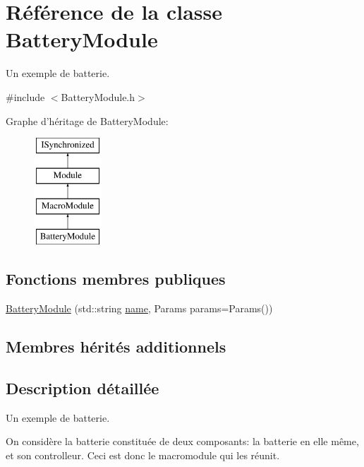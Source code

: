 \hypertarget{classBatteryModule}{\section{Référence de la classe Battery\-Module}
\label{classBatteryModule}
}


Un exemple de batterie.  




{\ttfamily \#include $<$Battery\-Module.\-h$>$}

Graphe d'héritage de Battery\-Module\-:\begin{figure}[H]
\begin{center}
\leavevmode
\includegraphics[height=4.000000cm]{classBatteryModule}
\end{center}
\end{figure}
\subsection*{Fonctions membres publiques}
\begin{DoxyCompactItemize}
\item 
\hyperlink{classBatteryModule_a2fb494ef5f124c38c0fdf9ccfb31918f}{Battery\-Module} (std\-::string \hyperlink{classModule_a794fbb44972c7c73cc197159093e66d1}{name}, Params params=Params())
\end{DoxyCompactItemize}
\subsection*{Membres hérités additionnels}


\subsection{Description détaillée}
Un exemple de batterie. 

On considère la batterie constituée de deux composants\-: la batterie en elle même, et son controlleur. Ceci est donc le macromodule qui les réunit. 

